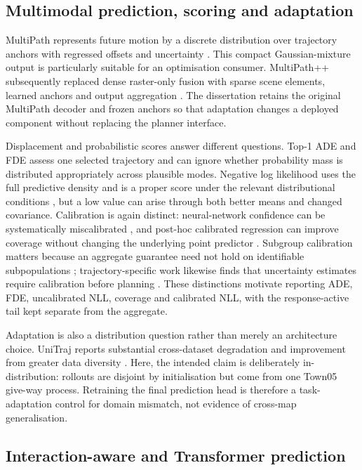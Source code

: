 \subsection{Multimodal prediction, scoring and adaptation}

MultiPath represents future motion by a discrete distribution over trajectory
anchors with regressed offsets and uncertainty \citep{chai2020multipath}. This
compact Gaussian-mixture output is particularly suitable for an optimisation
consumer. MultiPath++ subsequently replaced dense raster-only fusion with
sparse scene elements, learned anchors and output aggregation
\citep{varadarajan2022multipathpp}. The dissertation retains the original
MultiPath decoder and frozen anchors so that adaptation changes a deployed
component without replacing the planner interface.

Displacement and probabilistic scores answer different questions. Top-1 ADE
and FDE assess one selected trajectory and can ignore whether probability mass
is distributed appropriately across plausible modes. Negative log likelihood
uses the full predictive density and is a proper score under the relevant
distributional conditions \citep{gneiting2007scoring}, but a low value can
arise through both better means and changed covariance. Calibration is again
distinct: neural-network confidence can be systematically miscalibrated
\citep{guo2017calibration}, and post-hoc calibrated regression can improve
coverage without changing the underlying point predictor
\citep{kuleshov2018calibrated}. Subgroup calibration matters because an
aggregate guarantee need not hold on identifiable subpopulations
\citep{hebertjohnson2018multicalibration}; trajectory-specific work likewise
finds that uncertainty estimates require calibration before planning
\citep{cao2024cctr}. These distinctions motivate reporting ADE, FDE,
uncalibrated NLL, coverage and calibrated NLL, with the response-active tail
kept separate from the aggregate.

Adaptation is also a distribution question rather than merely an architecture
choice. UniTraj reports substantial cross-dataset degradation and improvement
from greater data diversity \citep{feng2024unitraj}. Here, the intended claim
is deliberately in-distribution: rollouts are disjoint by initialisation but
come from one Town05 give-way process. Retraining the final prediction head is
therefore a task-adaptation control for domain mismatch, not evidence of
cross-map generalisation.

\subsection{Interaction-aware and Transformer prediction}

